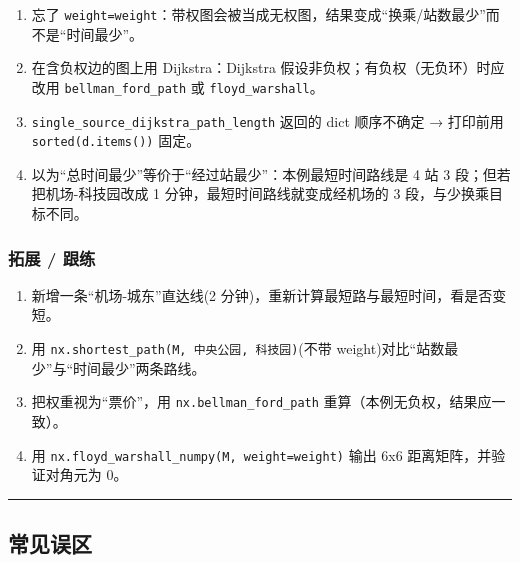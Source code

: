 \begin{enumerate}
\def\labelenumi{\arabic{enumi}.}
\tightlist
\item
  忘了
  \texttt{weight=\textquotesingle{}weight\textquotesingle{}}：带权图会被当成无权图，结果变成``换乘/站数最少''而不是``时间最少''。
\item
  在含负权边的图上用 Dijkstra：Dijkstra
  假设非负权；有负权（无负环）时应改用 \texttt{bellman\_ford\_path} 或
  \texttt{floyd\_warshall}。
\item
  \texttt{single\_source\_dijkstra\_path\_length} 返回的 dict 顺序不确定
  → 打印前用 \texttt{sorted(d.items())} 固定。
\item
  以为``总时间最少''等价于``经过站最少''：本例最短时间路线是 4 站 3
  段；但若把机场-科技园改成 1 分钟，最短时间路线就变成经机场的 3
  段，与少换乘目标不同。
\end{enumerate}

\subsubsection{拓展 / 跟练}\label{ux62d3ux5c55-ux8ddfux7ec3-14}

\begin{enumerate}
\def\labelenumi{\arabic{enumi}.}
\tightlist
\item
  新增一条``机场-城东''直达线(2
  分钟)，重新计算最短路与最短时间，看是否变短。
\item
  用
  \texttt{nx.shortest\_path(M,\ \textquotesingle{}中央公园\textquotesingle{},\ \textquotesingle{}科技园\textquotesingle{})}(不带
  weight)对比``站数最少''与``时间最少''两条路线。
\item
  把权重视为``票价''，用 \texttt{nx.bellman\_ford\_path}
  重算（本例无负权，结果应一致）。
\item
  用
  \texttt{nx.floyd\_warshall\_numpy(M,\ weight=\textquotesingle{}weight\textquotesingle{})}
  输出 6x6 距离矩阵，并验证对角元为 0。
\end{enumerate}

\begin{center}\rule{0.5\linewidth}{0.5pt}\end{center}

\subsection{常见误区}\label{ux5e38ux89c1ux8befux533a-19}

